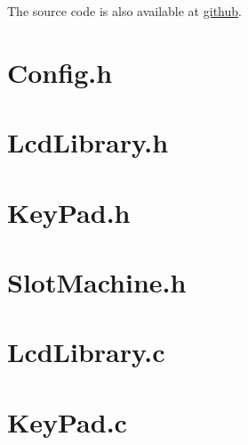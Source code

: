 \documentclass[a4paper,13pt,openany,sffamily]{memoir}
\begin{document}
The source code is also available at \href{https://github.com/simplybiplav/SlotMachine}{github}.


\section{Config.h}
\begin{small}

\end{small}

\newpage
\section{LcdLibrary.h}
\begin{small}

\end{small}

\newpage
\section{KeyPad.h}
\begin{small}

\end{small}

\newpage
\section{SlotMachine.h}
\begin{small}

\end{small}


\newpage
\section{LcdLibrary.c}
\begin{small}

\end{small}


\newpage
\section{KeyPad.c}
\begin{small}

\end{small}
\end{document}
